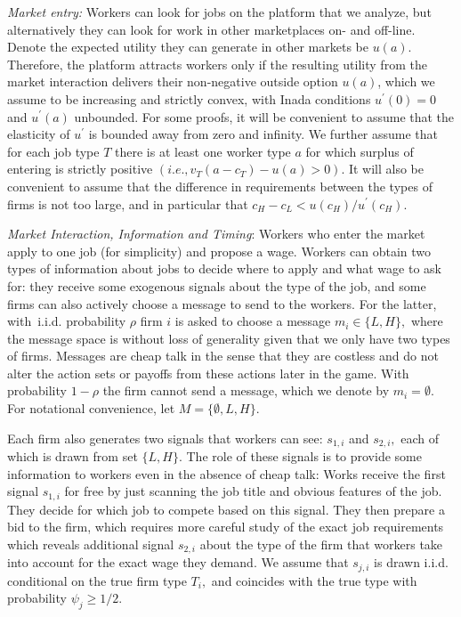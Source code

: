 \documentclass[12pt]{article}
\begin{document}
\textit{Market entry:} Workers can look for jobs on the platform that we analyze, but alternatively they can look for work in other marketplaces on- and off-line. Denote the expected utility they can generate in other markets be $u(a)$. Therefore, the platform attracts workers only if the resulting utility from the market interaction delivers their non-negative outside option $u(a)$,
which we assume to be increasing and strictly convex, with Inada conditions $%
u^{\prime }(0)=0$ and $u^{\prime }(a)$ unbounded. For some proofs, it will be
convenient to assume that the elasticity of $u^{\prime }$ is bounded away
from zero and infinity. We further assume that for each job type $T$ there is at least one worker type $%
a$ for which surplus of entering is strictly positive $%
(i.e.,v_{T}(a-c_{T})-u\left( a\right) >0).$ It will also be convenient to
assume that the difference in requirements between the types of firms is not
too large, and in particular that $c_{H}-c_{L}<u(c_{H})/u^{\prime }(c_{H}).$


\textit{Market Interaction, Information and Timing}: Workers who enter the market apply to one job (for simplicity) and propose a wage. Workers can obtain two types of information about jobs to decide where to apply and what wage to ask for: they receive some exogenous signals about the type of the job, and some firms can also actively choose a message to send to the workers. For the latter, with\ i.i.d. probability $\rho $ firm $i$ is asked to choose a message $m_{i}\in \{L,H\},$ where the
message space is without loss of generality given that we only have two
types of firms. Messages are cheap talk in the sense that they are costless and do not alter the action sets or payoffs from these actions later in the game. With probability $1-\rho $ the firm cannot send a message,
which we denote by $m_{i}=\emptyset .$ For notational convenience, let $%
M=\{\emptyset ,L,H\}$. 

Each firm also generates two signals that workers can see: $s_{1,i}$ and $s_{2,i},$
each of which is drawn from set $\{L,H\}.$ The role of these signals is to provide some information to workers even in the absence of cheap talk: Works receive the first signal $s_{1,i}$ for free by just scanning the job title and obvious features of the job. They decide for which job to compete based on this signal. They then prepare a bid to the firm, which requires more careful study of the exact job requirements which reveals additional signal $s_{2,i}$ about the type of the firm that workers take into account for the exact wage they demand. We assume that $s_{j,i}$ is drawn i.i.d.
conditional on the true firm type $T_{i},$ and coincides with the
true type with probability $\psi _{j}\geq 1/2$. 
\end{document}
